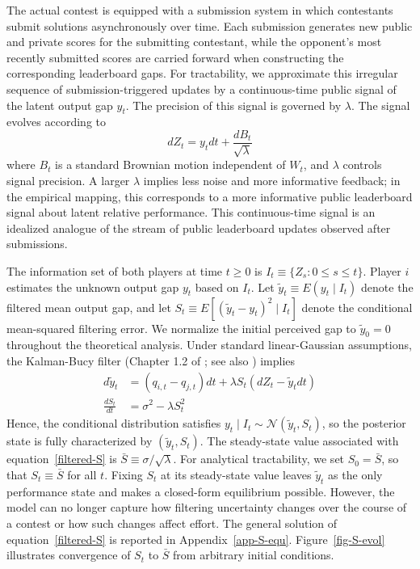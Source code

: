\documentclass[mnsc]{informs3}
\begin{document}
The actual contest is equipped with a submission system in which contestants submit solutions asynchronously over time. Each submission generates new public and private scores for the submitting contestant, while the opponent's most recently submitted scores are carried forward when constructing the corresponding leaderboard gaps.
For tractability, we approximate this irregular sequence of submission-triggered updates by a continuous-time public signal of the latent output gap $y_t$.
The precision of this signal is governed by $\lambda$.
The signal evolves according to
\begin{equation}\label{signal}
	dZ_{t} = y_{t}dt + \frac{dB_{t}}{\sqrt{\lambda}}
\end{equation}
where $B_{t}$ is a standard Brownian motion independent of $W_t$, and $\lambda$ controls signal precision.
A larger $\lambda$ implies less noise and more informative feedback; in the empirical mapping, this corresponds to a more informative public leaderboard signal about latent relative performance.
This continuous-time signal is an idealized analogue of the stream of public leaderboard updates observed after submissions.

The information set of both players at time $t \ge 0$ is $I_t \equiv \{Z_s : 0 \le s \le t\}$.
Player $i$ estimates the unknown output gap $y_t$ based on $I_t$.
Let $\tilde{y}_t \equiv E(y_t \mid I_t)$ denote the filtered mean output gap, and let
$S_t \equiv E[(\tilde{y}_t-y_t)^2 \mid I_t]$ denote the conditional mean-squared filtering error.
We normalize the initial perceived gap to $\tilde y_0=0$ throughout the theoretical analysis.
Under standard linear-Gaussian assumptions, the Kalman-Bucy filter (Chapter 1.2 of \citealt{Bensoussan1992Control}; see also \citealt{frogerais2012various,barrau2017invariant}) implies
\begin{align}
	d\tilde{y}_{t} &= (q_{i,t}-q_{j,t})dt + \lambda S_{t}(dZ_{t}-\tilde{y}_{t}dt)
	\label{filtered-x}\\
	\frac{dS_{t}}{dt} &= \sigma^2 - \lambda S_{t}^2
	\label{filtered-S}
\end{align}
Hence, the conditional distribution satisfies $y_t \mid I_t \sim \mathcal{N}(\tilde{y}_t,S_t)$, so the posterior state is fully characterized by $(\tilde y_t,S_t)$.
The steady-state value associated with equation~\eqref{filtered-S} is $\bar S \equiv \sigma/\sqrt{\lambda}$.
For analytical tractability, we set $S_0=\bar S$, so that $S_t \equiv \bar S$ for all $t$.
Fixing \(S_t\) at its steady-state value leaves \(\tilde y_t\) as the only performance state and makes a closed-form equilibrium possible. 
However, the model can no longer capture how filtering uncertainty changes over the course of a contest or how such changes affect effort.
The general solution of equation~\eqref{filtered-S} is reported in Appendix~\ref{app-S-equ}.
Figure~\ref{fig-S-evol} illustrates convergence of $S_t$ to $\bar S$ from arbitrary initial conditions.
\end{document}
